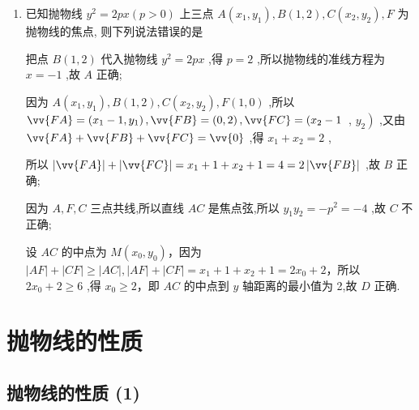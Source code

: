 \begin{enumerate}
\begin{jieda}
    \end{jieda}
    
    \item 已知抛物线 ${y}^{2} = {2px}\left( {p > 0}\right)$ 上三点 $A\left( {{x}_{1},{y}_{1}}\right) ,B\left( {1,2}\right) ,C\left( {{x}_{2},{y}_{2}}\right) ,F$ 为抛物线的焦点, 则下列说法错误的是
    \begin{jieda}
        把点 $B\left( {1,2}\right)$ 代入抛物线 ${y}^{2} = {2px}$ ,得 $p = 2$ ,所以抛物线的准线方程为 $x =  - 1$ ,故 ${A}$ 正确;
        
        因为 $A\left( {{x}_{1},{y}_{1}}\right) ,B\left( {1,2}\right) ,C\left( {{x}_{2},{y}_{2}}\right) ,F\left( {1,0}\right)$ ,所以 $\vv{FA} = \left( {{x}_{1} - 1,{y}_{1}}\right) ,\vv{FB} = \left( {0,2}\right) ,\vv{FC} = \left( {{x}_{2} - 1}\right.$ , $\left. {y}_{2}\right)$ ,又由 $\vv{FA} + \vv{FB} + \vv{FC} = \vv{0}$ ,得 ${x}_{1} + {x}_{2} = 2$ ,
        
        所以 $\left| \vv{FA}\right|  + \left| \vv{FC}\right|  = {x}_{1} + 1 + {x}_{2} + 1 = 4 = 2\left| \vv{FB}\right|$ ,故 ${B}$ 正确;
        
        因为 $A,F,C$ 三点共线,所以直线 ${AC}$ 是焦点弦,所以 ${y}_{1}{y}_{2} =  - {p}^{2} =  - 4$ ,故 ${C}$ 不正确; 
        
        
        设 ${AC}$ 的中点为 $M\left( {{x}_{0},{y}_{0}}\right)$，因为 $\left| {AF}\right|  + \left| {CF}\right|  \geq  \left| {AC}\right| ,\left| {AF}\right|  + \left| {CF}\right|  = {x}_{1} + 1 + {x}_{2} + 1 = 2{x}_{0} + 2$，所以 $2{x}_{0} + 2 \geq  6$ ,得 ${x}_{0} \geq  2$，即 ${AC}$ 的中点到 $y$ 轴距离的最小值为 2,故 ${D}$ 正确.
    \end{jieda}
\end{enumerate}

\section*{抛物线的性质}
\subsection*{抛物线的性质 (1)}


